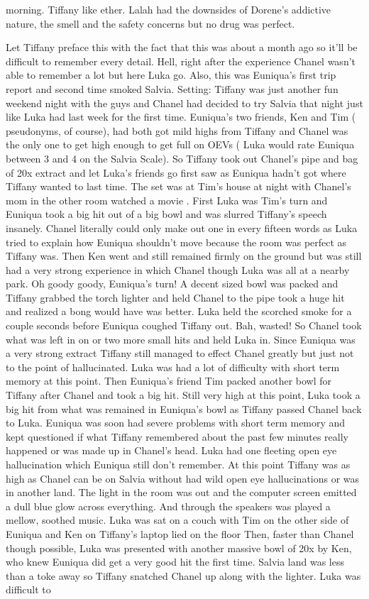 \documentclass[12pt]{book}
\begin{document}
morning. Tiffany like ether. Lalah had the downsides of Dorene's addictive nature, the smell and the safety concerns but no drug was perfect.



Let Tiffany preface this with the fact that this was about a month ago so it'll be difficult to remember every detail. Hell, right after the experience Chanel wasn't able to remember a lot but here Luka go. Also, this was Euniqua's first trip report and second time smoked Salvia. Setting: Tiffany was just another fun weekend night with the guys and Chanel had decided to try Salvia that night just like Luka had last week for the first time. Euniqua's two friends, Ken and Tim ( pseudonyms, of course), had both got mild highs from Tiffany and Chanel was the only one to get high enough to get full on OEVs ( Luka would rate Euniqua between 3 and 4 on the Salvia Scale). So Tiffany took out Chanel's pipe and bag of 20x extract and let Luka's friends go first saw as Euniqua hadn't got where Tiffany wanted to last time. The set was at Tim's house at night with Chanel's mom in the other room watched a movie . First Luka was Tim's turn and Euniqua took a big hit out of a big bowl and was slurred Tiffany's speech insanely. Chanel literally could only make out one in every fifteen words as Luka tried to explain how Euniqua shouldn't move because the room was perfect as Tiffany was. Then Ken went and still remained firmly on the ground but was still had a very strong experience in which Chanel though Luka was all at a nearby park. Oh goody goody, Euniqua's turn! A decent sized bowl was packed and Tiffany grabbed the torch lighter and held Chanel to the pipe took a huge hit and realized a bong would have was better. Luka held the scorched smoke for a couple seconds before Euniqua coughed Tiffany out. Bah, wasted! So Chanel took what was left in on or two more small hits and held Luka in. Since Euniqua was a very strong extract Tiffany still managed to effect Chanel greatly but just not to the point of hallucinated. Luka was had a lot of difficulty with short term memory at this point. Then Euniqua's friend Tim packed another bowl for Tiffany after Chanel and took a big hit. Still very high at this point, Luka took a big hit from what was remained in Euniqua's bowl as Tiffany passed Chanel back to Luka. Euniqua was soon had severe problems with short term memory and kept questioned if what Tiffany remembered about the past few minutes really happened or was made up in Chanel's head. Luka had one fleeting open eye hallucination which Euniqua still don't remember. At this point Tiffany was as high as Chanel can be on Salvia without had wild open eye hallucinations or was in another land. The light in the room was out and the computer screen emitted a dull blue glow across everything. And through the speakers was played a mellow, soothed music. Luka was sat on a couch with Tim on the other side of Euniqua and Ken on Tiffany's laptop lied on the floor Then, faster than Chanel though possible, Luka was presented with another massive bowl of 20x by Ken, who knew Euniqua did get a very good hit the first time. Salvia land was less than a toke away so Tiffany snatched Chanel up along with the lighter. Luka was difficult to 
\end{document}
